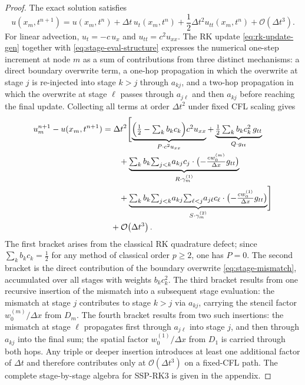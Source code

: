 \documentclass[review,hidelinks,onefignum,onetabnum]{siamart251216}
\newcommand{\Dt}{\Delta t}
\newcommand{\Dx}{\Delta x}
\newcommand{\Order}[1]{\mathcal{O}\!\left(#1\right)}
\begin{document}
\begin{proof}
The exact solution satisfies
\begin{equation}
  u(x_m,t^{n+1})
  = u(x_m,t^n) + \Dt\,u_t(x_m,t^n) + \frac{1}{2}\Dt^2 u_{tt}(x_m,t^n)
    + \Order{\Dt^3}.
  \label{eq:exact-taylor-main}
\end{equation}
For linear advection, $u_t=-c\,u_x$ and $u_{tt}=c^2u_{xx}$. The RK update \eqref{eq:rk-update-gen} together with \eqref{eq:stage-eval-structure} expresses the numerical one-step increment at node $m$ as a sum of contributions from three distinct mechanisms: a direct boundary overwrite term, a one-hop propagation in which the overwrite at stage $j$ is re-injected into stage $k>j$ through $a_{kj}$, and a two-hop propagation in which the overwrite at stage $\ell$ passes through $a_{j\ell}$ and then $a_{kj}$ before reaching the final update. Collecting all terms at order $\Dt^2$ under fixed CFL scaling gives
\begin{equation}
  \begin{split}
    u_m^{n+1} - u(x_m,t^{n+1})
    &= \Dt^2\Biggl[
        \underbrace{\Bigl(\tfrac{1}{2}-\textstyle\sum_k b_k c_k\Bigr)c^2 u_{xx}}_{P\cdot c^2 u_{xx}}
        +\underbrace{\tfrac{1}{2}\textstyle\sum_k b_k c_k^2\, g_{tt}}_{Q\cdot g_{tt}} \\
    &\qquad
        +\underbrace{\textstyle\sum_k b_k\!\sum_{j<k}\!a_{kj}c_j
          \cdot\bigl(-\tfrac{c w_0^{(m)}}{\Dx}g_{tt}\bigr)}_{R\cdot\gamma_m^{(1)}}
          \\
    &\qquad
        +\underbrace{\textstyle\sum_k b_k\!\sum_{j<k}\!a_{kj}
          \!\sum_{\ell<j}\!a_{j\ell}c_\ell
          \cdot\bigl(-\tfrac{cw_0^{(1)}}{\Dx}g_{tt}\bigr)}_{S\cdot\gamma_m^{(2)}}
      \Biggr] \\
    &\quad +\Order{\Dt^3}.
  \end{split}
  \label{eq:proof-assembly}
\end{equation}
The first bracket arises from the classical RK quadrature defect; since $\sum_k b_k c_k=\tfrac{1}{2}$ for any method of classical order $p\ge 2$, one has $P=0$. The second bracket is the direct contribution of the boundary overwrite \eqref{eq:stage-mismatch}, accumulated over all stages with weights $b_k c_k^2$. The third bracket results from one recursive insertion of the mismatch into a subsequent stage evaluation: the mismatch at stage $j$ contributes to stage $k>j$ via $a_{kj}$, carrying the stencil factor $w_0^{(m)}/\Dx$ from $D_m$. The fourth bracket results from two such insertions: the mismatch at stage $\ell$ propagates first through $a_{j\ell}$ into stage $j$, and then through $a_{kj}$ into the final sum; the spatial factor $w_0^{(1)}/\Dx$ from $D_1$ is carried through both hops. Any triple or deeper insertion introduces at least one additional factor of $\Dt$ and therefore contributes only at $\Order{\Dt^3}$ on a fixed-CFL path. The complete stage-by-stage algebra for SSP-RK3 is given in the appendix.
\end{proof}
\end{document}
